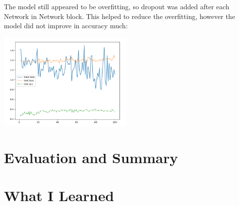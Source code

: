 \documentclass{article}[12pt]
\begin{document}
The model still appeared to be overfitting, so dropout was added after each Network in Network block. This helped to reduce the overfitting, however the model did not improve in accuracy much:\\

\begin{center}
    \includegraphics[width=0.5\textwidth]{images/model_augmented_dropout.png}
\end{center}


\section*{Evaluation and Summary}


\section*{What I Learned}




\end{document}
